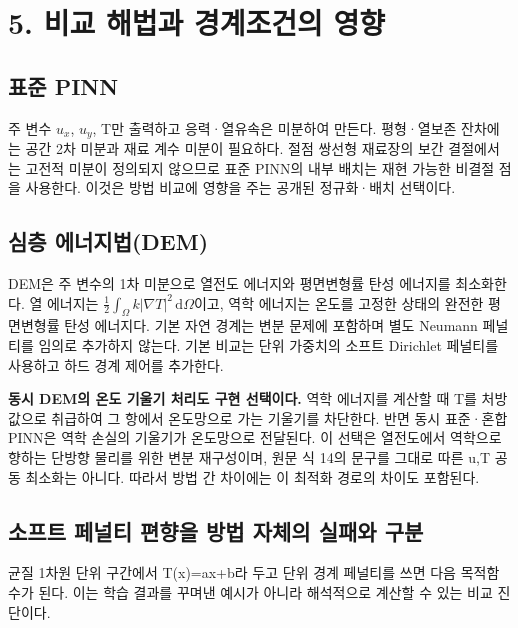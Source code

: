 \documentclass[10pt,a4paper]{article}
\begin{document}
\clearpage

\section{5. 비교 해법과 경계조건의 영향}

\subsection{표준 PINN}

주 변수 $u_x$, $u_y$, T만 출력하고 응력·열유속은 미분하여 만든다. 평형·열보존 잔차에는 공간 2차 미분과 재료 계수 미분이 필요하다. 절점 쌍선형 재료장의 보간 결절에서는 고전적 미분이 정의되지 않으므로 표준 PINN의 내부 배치는 재현 가능한 비결절 점을 사용한다. 이것은 방법 비교에 영향을 주는 공개된 정규화·배치 선택이다.\par

\subsection{심층 에너지법(DEM)}

DEM은 주 변수의 1차 미분으로 열전도 에너지와 평면변형률 탄성 에너지를 최소화한다. 열 에너지는 $\frac12\int_\Omega k|\nabla T|^2\,\mathrm d\Omega$이고, 역학 에너지는 온도를 고정한 상태의 완전한 평면변형률 탄성 에너지다. 기본 자연 경계는 변분 문제에 포함하며 별도 Neumann 페널티를 임의로 추가하지 않는다. 기본 비교는 단위 가중치의 소프트 Dirichlet 페널티를 사용하고 하드 경계 제어를 추가한다.\par

{\small\color{muted} \textbf{동시 DEM의 온도 기울기 처리도 구현 선택이다.} 역학 에너지를 계산할 때 T를 처방값으로 취급하여 그 항에서 온도망으로 가는 기울기를 차단한다. 반면 동시 표준·혼합 PINN은 역학 손실의 기울기가 온도망으로 전달된다. 이 선택은 열전도에서 역학으로 향하는 단방향 물리를 위한 변분 재구성이며, 원문 식 14의 문구를 그대로 따른 u,T 공동 최소화는 아니다. 따라서 방법 간 차이에는 이 최적화 경로의 차이도 포함된다.\par}

\subsection{소프트 페널티 편향을 방법 자체의 실패와 구분}

균질 1차원 단위 구간에서 T(x)=ax+b라 두고 단위 경계 페널티를 쓰면 다음 목적함수가 된다. 이는 학습 결과를 꾸며낸 예시가 아니라 해석적으로 계산할 수 있는 비교 진단이다.\par
\end{document}
